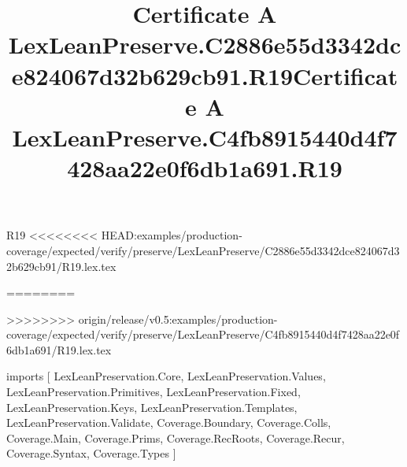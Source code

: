 \begin{lexlean}{R19}
<<<<<<<< HEAD:examples/production-coverage/expected/verify/preserve/LexLeanPreserve/C2886e55d3342dce824067d32b629cb91/R19.lex.tex
\title{Certificate A LexLeanPreserve.C2886e55d3342dce824067d32b629cb91.R19}
========
\title{Certificate A LexLeanPreserve.C4fb8915440d4f7428aa22e0f6db1a691.R19}
>>>>>>>> origin/release/v0.5:examples/production-coverage/expected/verify/preserve/LexLeanPreserve/C4fb8915440d4f7428aa22e0f6db1a691/R19.lex.tex
\begin{coremodule}
imports [
  LexLeanPreservation.Core,
  LexLeanPreservation.Values,
  LexLeanPreservation.Primitives,
  LexLeanPreservation.Fixed,
  LexLeanPreservation.Keys,
  LexLeanPreservation.Templates,
  LexLeanPreservation.Validate,
  Coverage.Boundary,
  Coverage.Colls,
  Coverage.Main,
  Coverage.Prims,
  Coverage.RecRoots,
  Coverage.Recur,
  Coverage.Syntax,
  Coverage.Types
]


\end{coremodule}
\end{lexlean}

